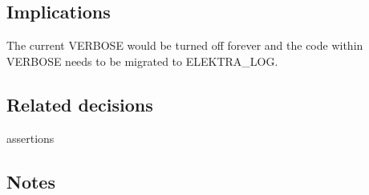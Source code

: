 \subsection*{Implications}

The current V\+E\+R\+B\+O\+SE would be turned off forever and the code within V\+E\+R\+B\+O\+SE needs to be migrated to {\ttfamily E\+L\+E\+K\+T\+R\+A\+\_\+\+L\+OG}.

\subsection*{Related decisions}


\begin{DoxyItemize}
\item assertions
\end{DoxyItemize}

\subsection*{Notes}